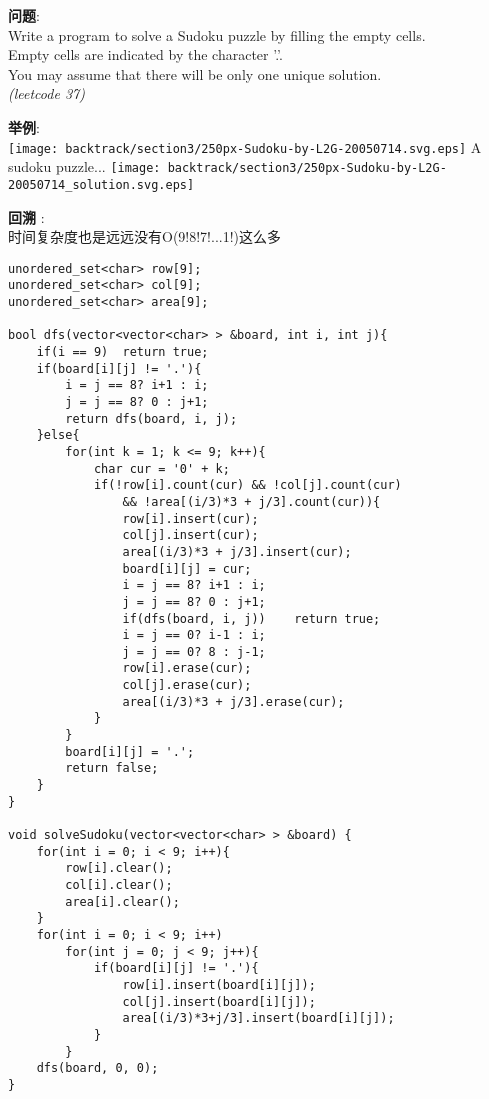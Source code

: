     
\begin{description}
    \item{\textbf{问题}}: \\
Write a program to solve a Sudoku puzzle by filling the empty cells.\\
Empty cells are indicated by the character '.'.\\
You may assume that there will be only one unique solution.\\
\textit{(leetcode 37)}
	\item{\textbf{举例}}:\\
\texttt{[image: backtrack/section3/250px-Sudoku-by-L2G-20050714.svg.eps]}
A sudoku puzzle...
\texttt{[image: backtrack/section3/250px-Sudoku-by-L2G-20050714\_solution.svg.eps]}
    \item{\textbf{回溯}} : 
    \\时间复杂度也是远远没有O(9!8!7!...1!)这么多
    \begin{lstlisting}
unordered_set<char> row[9]; 
unordered_set<char> col[9]; 
unordered_set<char> area[9]; 

bool dfs(vector<vector<char> > &board, int i, int j){
	if(i == 9)	return true;
	if(board[i][j] != '.'){
		i = j == 8? i+1 : i;
		j = j == 8? 0 : j+1;
		return dfs(board, i, j);
	}else{
		for(int k = 1; k <= 9; k++){
			char cur = '0' + k;
			if(!row[i].count(cur) && !col[j].count(cur) 
				&& !area[(i/3)*3 + j/3].count(cur)){
				row[i].insert(cur);
				col[j].insert(cur);
				area[(i/3)*3 + j/3].insert(cur);
				board[i][j] = cur;
				i = j == 8? i+1 : i;
				j = j == 8? 0 : j+1;
				if(dfs(board, i, j))	return true;
				i = j == 0? i-1 : i;
				j = j == 0? 8 : j-1;
				row[i].erase(cur);
				col[j].erase(cur);
				area[(i/3)*3 + j/3].erase(cur);
			}
		}
		board[i][j] = '.';
		return false;
	}
}

void solveSudoku(vector<vector<char> > &board) {
	for(int i = 0; i < 9; i++){
		row[i].clear();
		col[i].clear();
		area[i].clear();
	}
	for(int i = 0; i < 9; i++)
		for(int j = 0; j < 9; j++){
			if(board[i][j] != '.'){
				row[i].insert(board[i][j]);
				col[j].insert(board[i][j]);
				area[(i/3)*3+j/3].insert(board[i][j]);
			}
		}
	dfs(board, 0, 0);
}
    \end{lstlisting}
\end{description}

